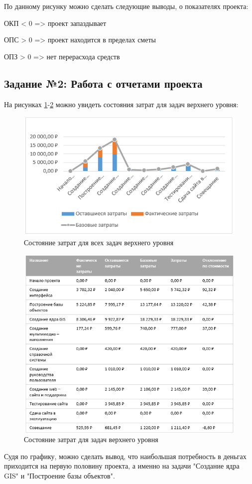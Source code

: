 По данному рисунку можно сделать следующие выводы, о показателях проекта:

\noindent ОКП < 0 => проект запаздывает

\noindent ОПС > 0 => проект находится в пределах сметы

\noindent ОПЗ > 0 => нет перерасхода средств

\newpage
\subsection*{Задание №2: Работа с отчетами проекта}

На рисунках \ref{p4}-\ref{p5} можно увидеть состояния затрат для задач верхнего уровня:
\begin{figure}[!h]
	\centering
	\includegraphics[width=0.7\linewidth]{inc/img/4.png}
	\caption{Состояние затрат для всех задач верхнего уровня}
	\label{p4}
\end{figure}

\begin{figure}[!h]
	\centering
	\includegraphics[width=0.7\linewidth]{inc/img/5.png}
	\caption{Состояние затрат для задач верхнего уровня}
	\label{p5}
\end{figure}

Судя по графику, можно сделать вывод, что наибольшая потребность в деньгах приходится на первую половину проекта, а именно на задачи "Создание ядра GIS" и "Построение базы объектов".

